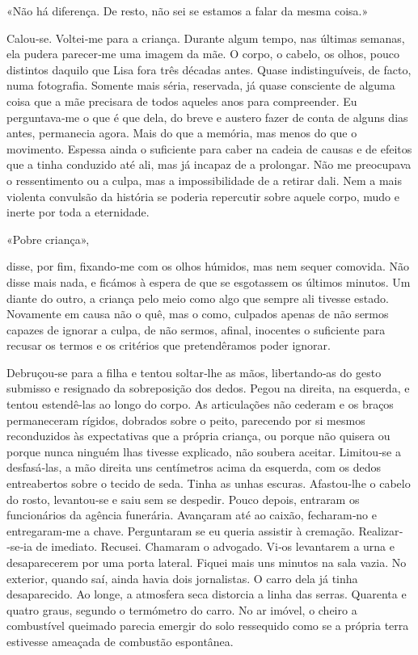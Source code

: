 «Não há diferença. De resto, não sei se estamos a falar da mesma coisa.»

Calou­‑se. Voltei­‑me para a criança. Durante algum tempo, nas últimas
semanas, ela pudera parecer­‑me uma imagem da mãe. O corpo, o cabelo, os
olhos, pouco distintos daquilo que Lisa fora três décadas antes. Quase
indistinguíveis, de facto, numa fotografia. Somente mais séria,
reservada, já quase consciente de alguma coisa que a mãe precisara de
todos aqueles anos para compreender. Eu perguntava­‑me o que é que dela,
do breve e austero fazer de conta de alguns dias antes, permanecia
agora. Mais do que a memória, mas menos do que o movimento. Espessa
ainda o suficiente para caber na cadeia de causas e de efeitos que a
tinha conduzido até ali, mas já incapaz de a prolongar. Não me
preocupava o ressentimento ou a culpa, mas a impossibilidade de a
retirar dali. Nem a mais violenta convulsão da história se poderia
repercutir sobre aquele corpo, mudo e inerte por toda a eternidade.

«Pobre criança»,

disse, por fim, fixando­‑me com os olhos húmidos, mas nem sequer
comovida. Não disse mais nada, e ficámos à espera de que se esgotassem
os últimos minutos. Um diante do outro, a criança pelo meio como algo
que sempre ali tivesse estado. Novamente em causa não o quê, mas o como,
culpados apenas de não sermos capazes de ignorar a culpa, de não sermos,
afinal, inocentes o suficiente para recusar os termos e os critérios que
pretendêramos poder ignorar.

Debruçou­‑se para a filha e tentou soltar­‑lhe as mãos, libertando­‑as
do gesto submisso e resignado da sobreposição dos dedos. Pegou na
direita, na esquerda, e tentou estendê­‑las ao longo do corpo. As
articulações não cederam e os braços permaneceram rígidos, dobrados
sobre o peito, parecendo por si mesmos reconduzidos às expectativas que
a própria criança, ou porque não quisera ou porque nunca ninguém lhas
tivesse explicado, não soubera aceitar. Limitou­‑se a desfasá­‑las, a
mão direita uns centímetros acima da esquerda, com os dedos entreabertos
sobre o tecido de seda. Tinha as unhas escuras. Afastou­‑lhe o cabelo do
rosto, levantou­‑se e saiu sem se despedir. Pouco depois, entraram os
funcionários da agência funerária. Avançaram até ao caixão, fecharam­‑no
e entregaram­‑me a chave. Perguntaram se eu queria assistir à cremação.
Realizar­‑se­‑ia de imediato. Recusei. Chamaram o advogado. Vi­‑os
levantarem a urna e desaparecerem por uma porta lateral. Fiquei mais uns
minutos na sala vazia. No exterior, quando saí, ainda havia dois
jornalistas. O carro dela já tinha desaparecido. Ao longe, a atmosfera
seca distorcia a linha das serras. Quarenta e quatro graus, segundo o
termómetro do carro. No ar imóvel, o cheiro a combustível queimado
parecia emergir do solo ressequido como se a própria terra estivesse
ameaçada de combustão espontânea.

